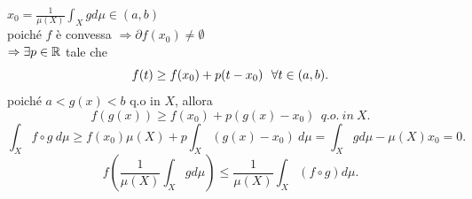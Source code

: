 \documentclass[12px]{article}
\begin{document}
   \begin{dimo}
	   $x_0 = \frac 1 {\mu(X)}\int_Xgd\mu\in(a,b)$\\
	   poiché $f$ è convessa $ \Rightarrow \partial f(x_0) \neq\emptyset$\\
	   $ \Rightarrow \exists p\in \mathbb{R}$ tale che 
	   \[
	   f(t) \geq f(x_0) + p (t-x_0)\ \ \forall t\in (a,b)\\
	   .\] 
	   poiché $a < g(x) < b$ q.o in $X$, allora\\
	    \[
	   f(g(x))\geq f(x_0) + p(g(x)-x_0)\ \ q.o.\ in \ X
	   .\] 
	   \[
	   \int_Xf\circ g \ d\mu \geq f(x_0)\mu(X) + p \int_X(g(x) - x_0)\ d \mu = \int_Xg d\mu - \mu(X)x_0= 0
	   .\] 
	   \[
		   f\left(\frac 1 {\mu(X)}\int_Xg d\mu\right)\leq \frac 1 {\mu(X)}\int_X (f\circ g)d\mu
	   .\] 
   \end{dimo}
\end{document}
